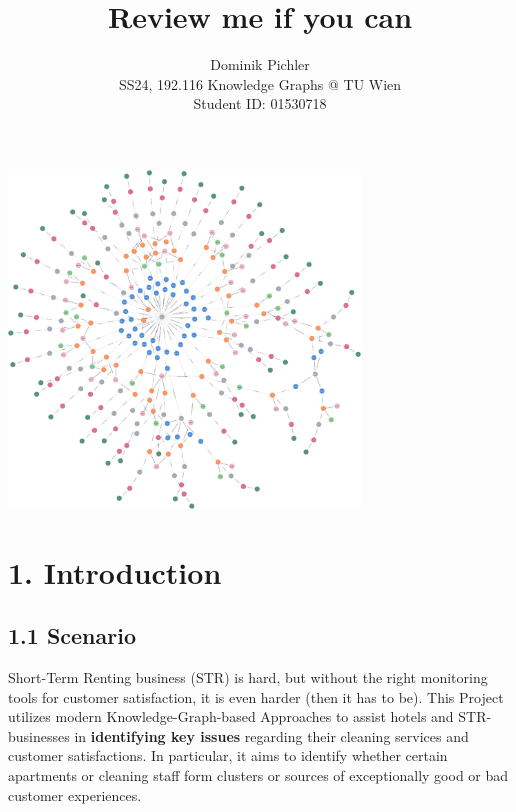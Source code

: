 \documentclass[
]{article}
\author{}
\date{}
\begin{document}
\title{Review me if you can}
\author{Dominik Pichler \\ SS24, 192.116 Knowledge Graphs @ TU Wien \\ Student ID: 01530718}
\date{}

\maketitle


\vspace*{10mm}


\begin{center}
  \includegraphics[width=0.7\textwidth]{drawings/graph_fully_con.png}
\end{center}


\pagebreak

\section{1. Introduction}\label{introduction}

\subsection{1.1 Scenario}\label{scenario}

Short-Term Renting business (STR) is hard, but without the right
monitoring tools for customer satisfaction, it is even harder (then it
has to be). This Project utilizes modern Knowledge-Graph-based
Approaches to assist hotels and STR-businesses in \textbf{identifying
key issues} regarding their cleaning services and customer
satisfactions. In particular, it aims to identify whether certain
apartments or cleaning staff form clusters or sources of exceptionally
good or bad customer experiences.
\end{document}
